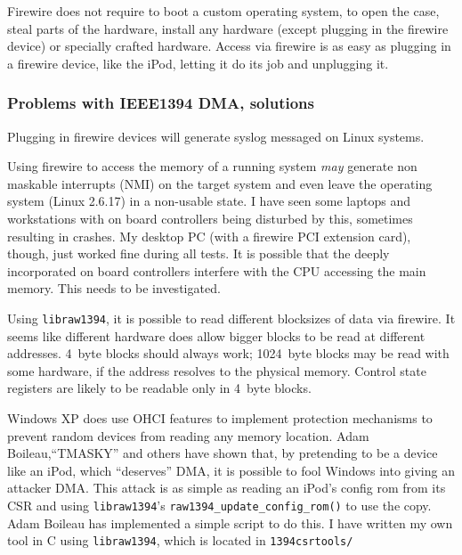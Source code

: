 Firewire does not require to boot a custom operating system, to open the case,
steal parts of the hardware, install any hardware (except plugging in the
firewire device) or specially crafted hardware.  Access via firewire is as easy
as plugging in a firewire device, like the iPod, letting it do its job and
unplugging it.




\subsubsection{Problems with IEEE1394 DMA, solutions}

Plugging in firewire devices will generate syslog messaged on Linux systems.

Using firewire to access the memory of a running system \emph{may} generate non
maskable interrupts (NMI) on the target system and even leave the operating
system (Linux 2.6.17) in a non-usable state. I have seen some laptops and
workstations with on board controllers being disturbed by this, sometimes
resulting in crashes. My desktop PC (with a firewire PCI extension card),
though, just worked fine during all tests. It is possible that the deeply
incorporated on board controllers interfere with the CPU accessing the main
memory. This needs to be investigated.


Using \texttt{libraw1394}, it is possible to read different blocksizes of data
via firewire.  It seems like different hardware does allow bigger blocks to be
read at different addresses. 4~byte blocks should always work; 1024~byte blocks
may be read with some hardware, if the address resolves to the physical memory.
Control state registers are likely to be readable only in 4~byte blocks.

\label{windows-dma} Windows XP does use OHCI features to implement protection
mechanisms to prevent random devices from reading any memory location.  Adam
Boileau,``TMASKY'' and others have shown \cite{rux2k6firewire:2006} that, by
pretending to be a device like an iPod, which ``deserves'' DMA, it is possible
to fool Windows into giving an attacker DMA.  This attack is as simple as
reading an iPod's config rom from its CSR and using \texttt{libraw1394}'s
\texttt{raw1394\_update\_config\_rom()} to use the copy.  Adam Boileau has
implemented a simple script to do this. I have written my own tool in C using
\texttt{libraw1394}, which is located in \texttt{1394csrtools/}



